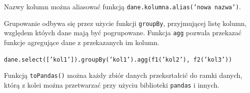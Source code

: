 \documentclass[11pt]{report}
\begin{document}
Nazwy kolumn można aliasować funkcją \texttt{dane.kolumna.alias('nowa nazwa')}.

Grupowanie odbywa się przez użycie funkcji \texttt{groupBy}, przyjmującej listę kolumn, względem któych dane mają być pogrupowane. Funkcja \texttt{agg} pozwala przekazać funkcje agregujące dane z przekazanych im kolumn.

\begin{center}
    \texttt{dane.select(['kol1']).groupBy('kol1').agg(f1('kol2'), f2('kol3'))}
\end{center}

Funkcją \texttt{toPandas()} można każdy zbiór danych przekształcić do ramki danych, którą z kolei można przetwarzać przy użyciu biblioteki \texttt{pandas} i innych.



\printbibliography[heading=subbibliography,title={Strony internetowe},keyword=www]
\end{document}
